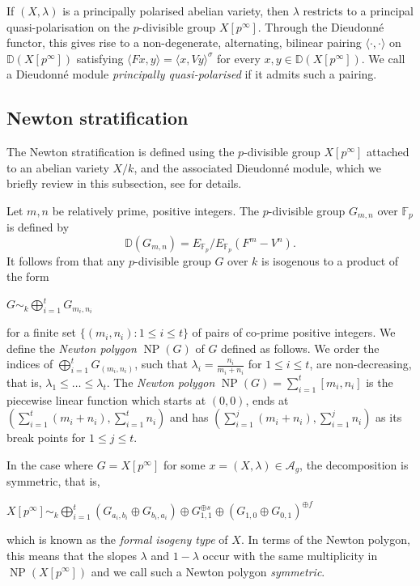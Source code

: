 \documentclass[11pt,table]{amsart}
\DeclareMathOperator{\NP}{NP}
\numberwithin{equation}{section}
\theoremstyle{definition}
\theoremstyle{remark}
\theoremstyle{remark}
\begin{document}
If $(X,\lambda)$ is a principally polarised abelian variety, then $\lambda$ restricts to a principal quasi-polarisation on the $p$-divisible group $X[p^\infty]$. Through the Dieudonn\'{e} functor, this gives rise to a non-degenerate, alternating, bilinear pairing $\langle \cdot , \cdot \rangle$ on $\mathbb{D}(X[p^\infty])$ satisfying $\langle Fx, y\rangle = \langle x, Vy\rangle^\sigma$ for every $x,y\in\mathbb{D}(X[p^\infty])$. We call a Dieudonn\'{e} module \textit{principally quasi-polarised} if it admits such a pairing. 

\subsection{Newton stratification} \label{npstrat}
The Newton stratification is defined using the $p$-divisible group $X[p^{\infty}]$ attached to an abelian variety $X/k$, and the associated Dieudonn{\'e} module, which we briefly review in this subsection, see \cite[Section 15.5]{oort2001stratification} for details.

Let $m,n$ be relatively prime, positive integers. The $p$-divisible group $G_{m,n}$ over $\mathbb{F}_p$ is defined by
$$\mathbb{D}(G_{m,n}) = E_{\mathbb{F}_p}/E_{\mathbb{F}_p}(F^m - V^n).$$
It follows from \cite[Section 4.3, Theorem 4.1]{yuri1963manin} that any $p$-divisible group $G$ over $k$ is isogenous to a product of the form 
\begin{center}
    $ G \sim_{k} \displaystyle \bigoplus_{i=1}^{t} G_{m_i, n_i}$
\end{center}
for a finite set $\{ (m_i, n_i) : 1 \le i \le t \}$ of pairs of co-prime positive integers.  We define the \textit{Newton polygon} $\NP(G)$ of $G$ defined as follows. We order the indices of  $\bigoplus_{i=1}^{t} G_{(m_i, n_i)}$, such that $\lambda_{i} = \frac{n_{i}}{m_{i} + n_{i}}$ for $ 1 \le i \le t$, are non-decreasing, that is,  $\lambda_{1} \le \ldots \le \lambda_{t}$. The \textit{Newton polygon} $\NP(G) = \sum_{i=1}^{t}[m_{i}, n_{i}]$ is the piecewise linear function which starts at $(0,0)$, ends at $(\sum_{i=1}^{t}(m_{i} + n_{i}), \sum_{i=1}^{t} n_{i})$ and has $(\sum_{i=1}^{j}(m_{i} + n_{i}), \sum_{i=1}^{j} n_{i})$ as its break points for $1 \le j \le t$.  


In the case where $G = X[p^{\infty}]$ for some $x = (X, \lambda) \in \mathcal{A}_g$, the decomposition is symmetric, that is, 
\begin{center}
    $X[p^{\infty}] \sim_{k} \displaystyle \bigoplus_{i=1}^{t}\left(G_{a_i,b_i} \oplus G_{b_i, a_i}\right) \oplus G_{1,1}^{\oplus s} \oplus \left(G_{1,0} \oplus G_{0,1}\right)^{\oplus f}$
\end{center}
which is known as the \textit{formal isogeny type} of $X$. In terms of the Newton polygon, this means that the slopes $\lambda$ and $1-\lambda$ occur with the same multiplicity in $\NP(X[p^\infty])$ and we call such a Newton polygon \textit{symmetric}.
\end{document}
